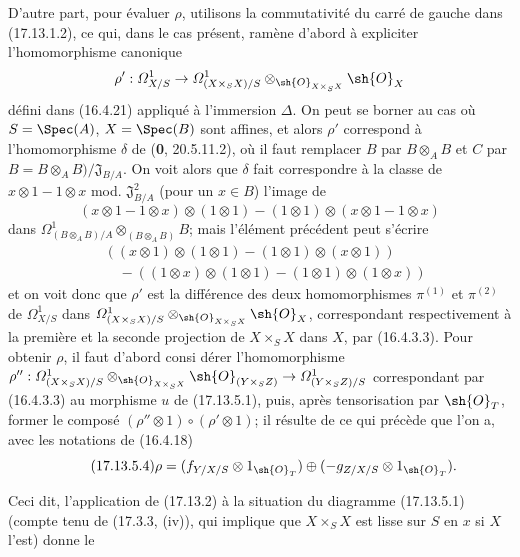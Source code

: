 \begin{env}[17.13.5]
D'autre part, pour évaluer $\rho$, utilisons la commutativité du carré de gauche dans (17.13.1.2), ce qui, dans le cas présent, ramène d'abord à expliciter l'homomorphisme canonique
\[
\rho':\varOmega^1_{X/S}\to\varOmega^1_{(X\times_SX)/S}\otimes_{\sh{O}_{X\times_SX}}\sh{O}_X
\]
défini dans (16.4.21) appliqué à l'immersion $\Delta$. On peut se borner au cas où $S=\Spec(A)$, $X=\Spec(B)$ sont affines, et alors $\rho'$ correspond à l'homomorphisme $\delta$ de (\textbf{0}, 20.5.11.2), où il faut remplacer $B$ par $B\otimes_AB$ et $C$ par $B=B\otimes_AB)/\mathfrak J_{B/A}$. On voit alors que $\delta$ fait correspondre à la classe de $x\otimes1-1\otimes x$ mod. $\mathfrak J_{B/A}^2$ (pour un $x\in B$) l'image de
\[
(x\otimes1-1\otimes x)\otimes(1\otimes1)-(1\otimes1)\otimes(x\otimes1-1\otimes x)
\]
dans $\Omega^1_{(B\otimes_AB)/A}\otimes_{(B\otimes_AB)}B$; mais l'élément précédent peut s'écrire
\[
\begin{split}
&((x\otimes1)\otimes(1\otimes1)-(1\otimes1)\otimes(x\otimes1))\\
&\quad-((1\otimes x)\otimes(1\otimes1)-(1\otimes1)\otimes(1\otimes x))
\end{split}
\]
et on voit donc que $\rho'$ est la différence des deux homomorphismes $\pi^{(1)}$ et $\pi^{(2)}$ de $\varOmega^1_{X/S}$ dans $\varOmega^1_{(X\times_SX)/S}\otimes_{\sh{O}_{X\times_SX}}\sh{O}_X$, correspondant respectivement à la première et la seconde projection de $X\times_SX$ dans $X$, par (16.4.3.3). Pour obtenir $\rho$, il faut d'abord consi%
dérer l'homomorphisme
$\rho'':\varOmega^1_{(X\times_SX)/S}\otimes_{\sh{O}_{X\times_SX}}\sh{O}_{(Y\times_SZ)}\to\varOmega^1_{(Y\times_SZ)/S}$ correspondant par (16.4.3.3) au morphisme $u$ de (17.13.5.1), puis, après tensorisation par $\sh{O}_T$, former le composé $(\rho''\otimes1)\circ(\rho'\otimes1)$; il résulte de ce qui précède que l'on a, avec les notations de (16.4.18)
\[
\label{IV.17.13.5.4}
\tag{17.13.5.4}
\rho=(f_{Y/X/S}\otimes1_{\sh{O}_T})\oplus(-g_{Z/X/S}\otimes1_{\sh{O}_T}).
\]

Ceci dit, l'application de (17.13.2) à la situation du diagramme (17.13.5.1) (compte tenu de (17.3.3, (iv)), qui implique que $X\times_SX$ est lisse sur $S$ en $x$ si $X$ l'est) donne le
\end{env}

